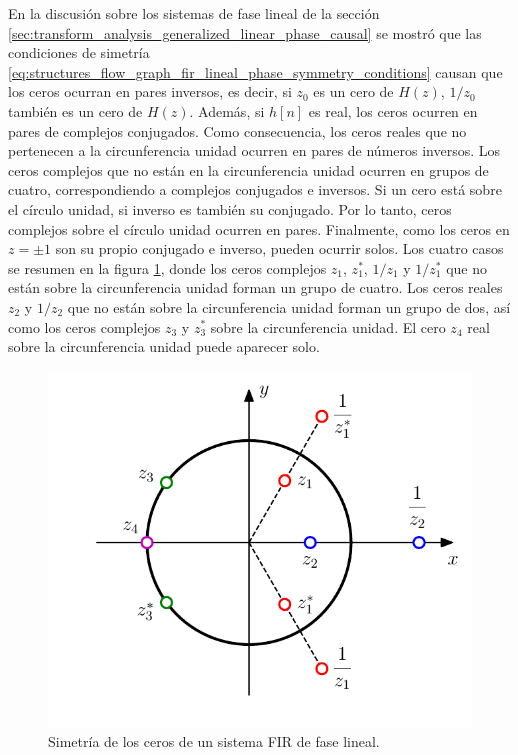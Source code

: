 \documentclass[a4paper]{report}
\begin{document}
En la discusión sobre los sistemas de fase lineal de la sección \ref{sec:transform_analysis_generalized_linear_phase_causal} se mostró que las condiciones de simetría \ref{eq:structures_flow_graph_fir_lineal_phase_symmetry_conditions} causan que los ceros ocurran en pares inversos, es decir, si \(z_0\) es un cero de \(H(z)\), \(1/z_0\) también es un cero de \(H(z)\). Además, si \(h[n]\) es real, los ceros ocurren en pares de complejos conjugados. Como consecuencia, los ceros reales que no pertenecen a la circunferencia unidad ocurren en pares de números inversos. Los ceros complejos que no están en la circunferencia unidad ocurren en grupos de cuatro, correspondiendo a complejos conjugados e inversos. Si un cero está sobre el círculo unidad, si inverso es también su conjugado. Por lo tanto, ceros complejos sobre el círculo unidad ocurren en pares. Finalmente, como los ceros en \(z=\pm1\) son su propio conjugado e inverso, pueden ocurrir solos. Los cuatro casos se resumen en la figura \ref{fig:structures_flow_graph_lineal_phase_FIR_zeros}, donde los ceros complejos \(z_1\), \(z^*_1\), \(1/z_1\) y \(1/z^*_1\) que no están sobre la circunferencia unidad forman un grupo de cuatro. Los ceros reales \(z_2\) y \(1/z_2\) que no están sobre la circunferencia unidad forman un grupo de dos, así como los ceros complejos \(z_3\) y \(z^*_3\) sobre la circunferencia unidad. El cero \(z_4\) real sobre la circunferencia unidad puede aparecer solo. 
\begin{figure}[!htb]
 \begin{minipage}[c]{0.49\textwidth}
  \includegraphics[width=\textwidth]{figuras/structures_flow_graph_lineal_phase_FIR_zeros.pdf}
 \end{minipage}\hfill
 \begin{minipage}[c]{0.41\textwidth}
  \caption{
     Simetría de los ceros de un sistema FIR de fase lineal.
  }\label{fig:structures_flow_graph_lineal_phase_FIR_zeros}
 \end{minipage}
\end{figure}
\end{document}
